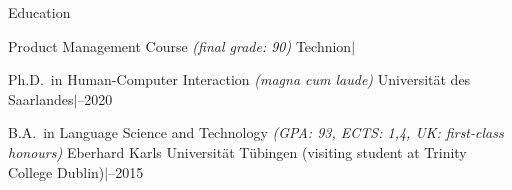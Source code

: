 \documentclass{resume} %
\begin{document}
\begin{rSection}{Education}
	
	\begin{rSubsection}
		{Product Management Course \footnotesize{\textit{(final grade: 90)}}}
		{}
		{Technion\quad$\vert$} %
		{}
		
		\setlength{\itemindent}{.5cm}
		
		\item[]\vspace{-0.6cm}%
	\end{rSubsection}
	
	\begin{rSubsection}
		{Ph.D.\ in Human-Computer Interaction \footnotesize{\textit{(magna cum laude)}}}
		{}
		{Universität des Saarlandes\quad$\vert$--2020} %
		{}
		
		\setlength{\itemindent}{.5cm}
		
		\item[]\vspace{-0.6cm}%
	\end{rSubsection}
	
	
	\begin{rSubsection}
		{B.A.\ in Language Science and Technology \footnotesize{\textit{(GPA: 93, ECTS: 1,4, UK: first-class honours)}}}
		{}
		{Eberhard Karls Universität Tübingen (visiting student at Trinity College Dublin)\quad$\vert$--2015} %
		{}
		

\end{rSubsection}
\end{rSection}
\end{document}
